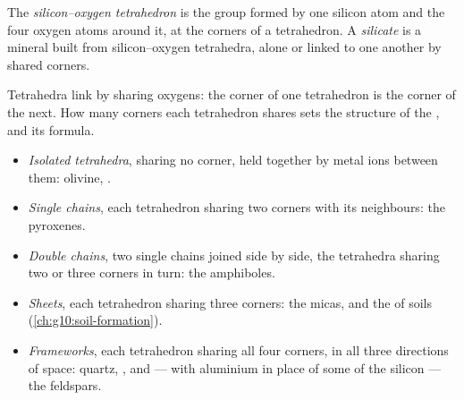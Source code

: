 \begin{definition}\label{def:g11:minerals:silicate}
The \emph{silicon--oxygen tetrahedron} is
the group  formed by one silicon atom and the four oxygen atoms
around it, at the corners of a tetrahedron. A
\emph{silicate} is a mineral built from silicon--oxygen
tetrahedra, alone or linked to one another by shared corners.
\end{definition}

Tetrahedra link by sharing oxygens: the corner of one tetrahedron is the
corner of the next. How many corners each tetrahedron shares sets the
structure of the , and its formula.
\begin{itemize}
  \item \emph{Isolated tetrahedra}, sharing no corner, held together by
        metal ions between them: olivine, .
  \item \emph{Single chains}, each tetrahedron sharing two corners with its
        neighbours: the pyroxenes.
  \item \emph{Double chains}, two single chains joined side by side, the
        tetrahedra sharing two or three corners in turn: the amphiboles.
  \item \emph{Sheets}, each tetrahedron sharing three corners: the micas,
        and the  of soils (\cref{ch:g10:soil-formation}).
  \item \emph{Frameworks}, each tetrahedron sharing all four corners, in all
        three directions of space: quartz, , and --- with aluminium
        in place of some of the silicon --- the feldspars.
\end{itemize}


